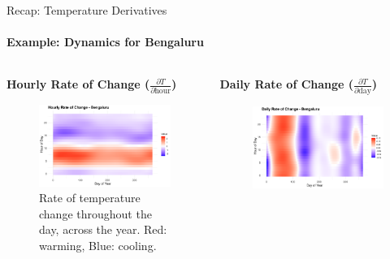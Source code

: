 \documentclass[svgnames, 12pt]{beamer}
\begin{document}
\begin{frame}{Recap: Temperature Derivatives}
  \framesubtitle{Example: Dynamics for Bengaluru}
  \begin{columns}[T] %
    \begin{column}{0.5\textwidth}
      \textbf{Hourly Rate of Change ($\frac{\partial T}{\partial \text{hour}}$)}
      \begin{figure}
        \includegraphics[width=\linewidth]{../data/output/figures/derivative_hour1_city_avg.png}
        \caption*{Rate of temperature change throughout the day, across the year. Red: warming, Blue: cooling.}
      \end{figure}
    \end{column}
    \begin{column}{0.5\textwidth}
      \textbf{Daily Rate of Change ($\frac{\partial T}{\partial \text{day}}$)}
      \begin{figure}
        \includegraphics[width=\linewidth]{../data/output/figures/derivative_day1_city_avg.png}

\end{figure}
\end{column}
\end{columns}
\end{frame}
\end{document}
